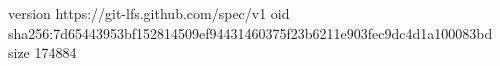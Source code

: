 version https://git-lfs.github.com/spec/v1
oid sha256:7d65443953bf152814509ef94431460375f23b6211e903fec9dc4d1a100083bd
size 174884
